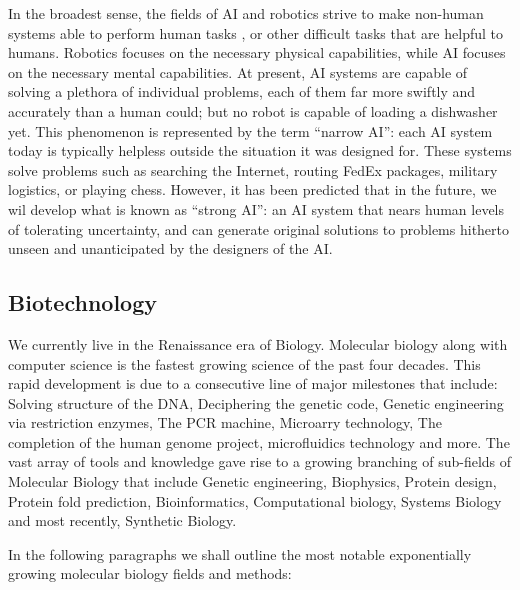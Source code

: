 \documentclass[letter,11pt]{article}
\begin{document}
In the broadest sense, the fields of AI and robotics strive to make non-human systems able to perform human tasks%
, or other difficult tasks that are helpful to humans. Robotics focuses on the necessary physical capabilities, while AI focuses on the necessary mental capabilities. At present, AI systems are capable of solving a plethora of individual problems, each of them far more swiftly and accurately than a human could; but no robot is capable of loading a dishwasher yet.
This phenomenon is represented by the term ``narrow AI'': each AI system today is typically helpless outside the situation it was designed for. These systems solve problems such as searching the Internet, routing FedEx packages, military logistics, or playing chess. However, it has been predicted that in the future, we wil develop what is known as ``strong AI'': an AI system that nears human levels of tolerating uncertainty, and can generate original solutions to problems hitherto unseen and unanticipated by the designers of the AI.

\subsection{Biotechnology}
\label{et-bio}

We currently live in the Renaissance era of Biology. Molecular biology along
with computer science is the fastest growing science of the past four decades.
This rapid development is due to a consecutive line of major milestones that
include: Solving structure of the DNA, Deciphering the genetic code, Genetic
engineering via restriction enzymes, The PCR machine, Microarry technology, The
completion of the human genome project, microfluidics technology and more. The
vast array of tools and knowledge gave rise to a growing branching of
sub-fields of Molecular Biology that include Genetic engineering, Biophysics,
Protein design, Protein fold prediction, Bioinformatics, Computational biology,
Systems Biology and most recently, Synthetic Biology.
 
In the following paragraphs we shall outline the most notable exponentially
growing molecular biology fields and methods:
 
\end{document}
